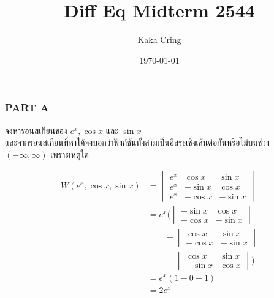 \documentclass[12pt,final]{novelette} %
\title{Diff Eq Midterm 2544}
\author{Kaka Cring}
\date{\today}
\begin{document}

\subsubsection*{PART A}

\begin{question}
    \item {}
    จงหารอนสเกียนของ $e^x, \cos x$ และ $\sin x$ \\
    และจากรอนสเกียนที่หาได้จงบอกว่าฟังก์ชันทั้งสามเป็นอิสระเชิงเส้นต่อกันหรือไม่บนช่วง $(-\infty, \infty)$ เพราะเหตุใด 

    \begin{align*}
        W(e^x, \cos x, \sin x) & =
        \begin{vmatrix}
            e^x & \cos x  & \sin x  \\
            e^x & -\sin x & \cos x  \\
            e^x & -\cos x & -\sin x
        \end{vmatrix}                           \\[1ex]
                               & =
        e^x\Bigg(
        \begin{vmatrix}
                -\sin x & \cos x  \\
                -\cos x & -\sin x
            \end{vmatrix}                                 \\
                               & \qquad -
        \begin{vmatrix}
                \cos x  & \sin x  \\
                -\cos x & -\sin x
            \end{vmatrix}                                 \\
                               & \qquad +
        \begin{vmatrix}
                \cos x  & \sin x \\
                -\sin x & \cos x
            \end{vmatrix}
        \Bigg)                                            \\
                               & =        e^x (1 - 0 + 1) \\
                               & = \boxed{2e^x}
    \end{align*}


\end{question}
\end{document}
